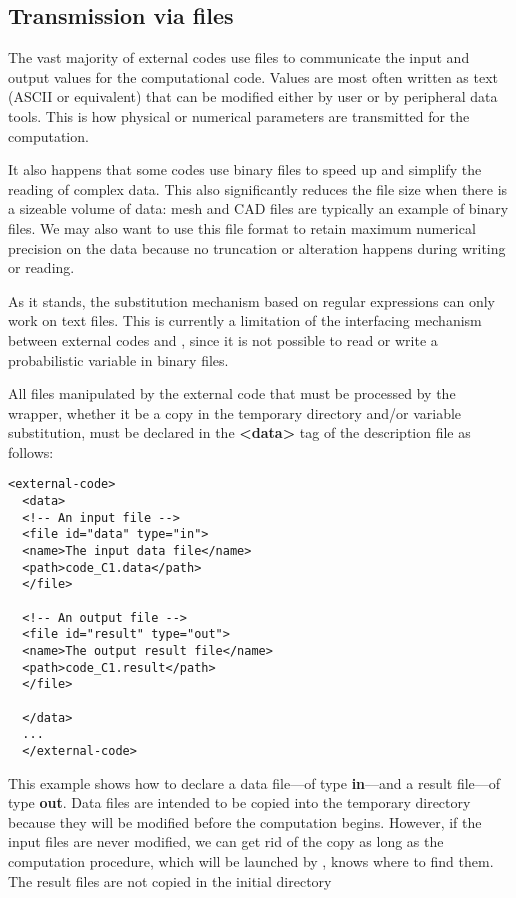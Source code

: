 \subsection{Transmission via files}

The vast majority of external codes use files to communicate the input and output values for the computational code. Values are most often written as text (ASCII or equivalent) that can be modified either by user or by peripheral data tools. This is how physical or numerical parameters are transmitted for the computation.

It also happens that some codes use binary files to speed up and simplify the reading of complex data. This also significantly reduces the file size when there is a sizeable volume of data: mesh and CAD files are typically an example of binary files. We may also want to use this file format to retain maximum numerical precision on the data because no truncation or alteration happens during writing or reading.

As it stands, the substitution mechanism based on regular expressions can only work on text files. This is currently a limitation of the interfacing mechanism between external codes and \OT, since it is not possible to read or write a probabilistic variable in binary files.

All files manipulated by the external code that must be processed by the wrapper, whether it be a copy in the temporary directory and/or variable substitution, must be declared in the {\bf <data>} tag of the description file as follows:

\lstset{language=XML, basicstyle=\normalsize}
\begin{lstlisting}[frame=TBRL]
  <external-code>
  <data>
  <!-- An input file -->
  <file id="data" type="in">
  <name>The input data file</name>
  <path>code_C1.data</path>
  </file>

  <!-- An output file -->
  <file id="result" type="out">
  <name>The output result file</name>
  <path>code_C1.result</path>
  </file>

  </data>
  ...
  </external-code>
\end{lstlisting}

This example shows how to declare a data file---of type {\bf in}---and a result file---of type {\bf out}. Data files are intended to be copied into the temporary directory because they will be modified before the computation begins. However, if the input files are never modified, we can get rid of the copy as long as the computation procedure, which will be launched by \OT, knows where to find them. The result files are not copied in the initial directory%


